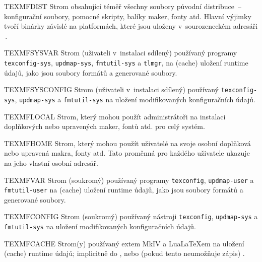 \documentclass[\classoptions,slovak,english,czech]{\classname}
\begin{document}
\begin{ttdescription}
\item [TEXMFDIST] Strom obsahující téměř všechny soubory původní 
distribuce~-- konfigurační soubory, pomocné skripty, balíky maker,
fonty atd. Hlavní výjimky tvoří binárky závislé na platformách, 
které jsou uloženy v~sourozeneckém adresáři \,. 
%
\item [TEXMFSYSVAR] Strom (uživateli v~instalaci sdílený) 
používaný programy 
\verb+texconfig-sys+, \verb+updmap-sys+, \verb+fmtutil-sys+ 
a \verb+tlmgr+, na (cache) uložení runtime
údajů, jako jsou soubory formátů a generované  soubory.
%
\item [TEXMFSYSCONFIG] Strom (uživateli v~instalaci sdílený) 
používaný \verb+texconfig-sys+, \verb+updmap-sys+ a \verb+fmtutil-sys+ 
na uložení modifikovaných konfiguračních údajů.
%
\item [TEXMFLOCAL] Strom, který mohou použít administrátoři na instalaci 
doplňkových nebo upravených maker, fontů atd. pro celý systém.
%
\item [TEXMFHOME] Strom, který mohou použít uživatelé 
na svoje osobní doplňková nebo upravená makra, fonty atd.
Tato proměnná pro
každého uživatele ukazuje na jeho vlastní osobní adresář. 

%
\item [TEXMFVAR] Strom (soukromý) používaný programy \verb+texconfig+, 
\verb+updmap-user+ a \verb+fmtutil-user+ na (cache) uložení runtime
údajů, jako jsou soubory formátů a generované  soubory.
%
\item [TEXMFCONFIG] Strom (soukromý) používaný nástroji  
\verb+texconfig+, \verb+updmap-sys+ a \verb+fmtutil-sys+ na uložení
modifikovaných konfiguračních údajů.
%
\item [TEXMFCACHE] Strom(y) používaný \ConTeXt{}extem 
MkIV a Lua\LaTeX{}em
na uložení (cache) runtime údajů; implicitně do , 
nebo (pokud tento neumožňuje zápis) .
\end{ttdescription}
\end{document}
